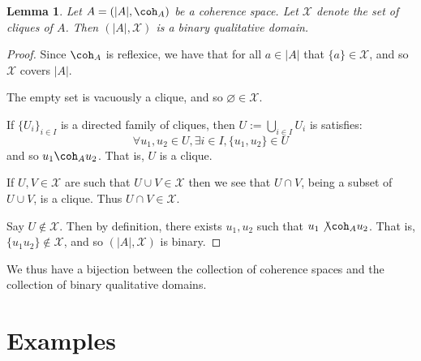 \documentclass[12pt]{article}
\theoremstyle{plain}
\newtheorem{lemma}[thm]{Lemma}
\theoremstyle{definition}
\newcommand{\scr}[1]{\mathscr{#1}}
\begin{document}
	\begin{lemma}
		Let $A = (|A|, \coh_A)$ be a coherence space. Let $\scr{X}$ denote the set of cliques of $A$. Then $(|A|, \scr{X})$ is a binary qualitative domain.
		\end{lemma}
	\begin{proof}
		Since $\coh_A$ is reflexice, we have that for all $a \in |A|$ that $\{ a \} \in \scr{X}$, and so $\scr{X}$ covers $|A|$.
		
		The empty set is vacuously a clique, and so $\varnothing \in \scr{X}$.
		
		If $\{ U_i \}_{i \in I}$ is a directed family of cliques, then $U := \bigcup_{i \in I}U_i$ is satisfies:
		\begin{equation}
			\forall u_1, u_2 \in U, \exists i \in I, \{ u_1, u_2 \} \in U
			\end{equation}
		and so $u_1 \coh_A u_2$. That is, $U$ is a clique.
		
		If $U,V \in \scr{X}$ are such that $U \cup V \in \scr{X}$ then we see that $U \cap V$, being a subset of $U \cup V$, is a clique. Thus $U \cap V \in \scr{X}$.
		
		Say $U \not\in \scr{X}$. Then by definition, there exists $u_1, u_2$ such that $u_1 \not\coh_A u_2$. That is, $\{ u_1 u_2 \} \not\in \scr{X}$, and so $(|A|,\scr{X})$ is binary.
		\end{proof}
	We thus have a bijection between the collection of coherence spaces and the collection of binary qualitative domains.
	
	\appendix
	\section{Examples}
	
\end{document}
